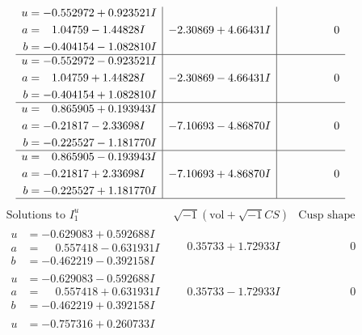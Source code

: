 \documentclass[1p]{elsarticle_modified}
\theoremstyle{definition}
\newcommand{\I}{\sqrt{-1}}
\begin{document}
$$\begin{array}{c|c|c}
\begin{aligned}
u &= -0.552972 + 0.923521 I \\
a &= \phantom{-}1.04759 - 1.44828 I \\
b &= -0.404154 - 1.082810 I\end{aligned}
 & -2.30869 + 4.66431 I & \phantom{-0.000000 } 0 \\ \hline\begin{aligned}
u &= -0.552972 - 0.923521 I \\
a &= \phantom{-}1.04759 + 1.44828 I \\
b &= -0.404154 + 1.082810 I\end{aligned}
 & -2.30869 - 4.66431 I & \phantom{-0.000000 } 0 \\ \hline\begin{aligned}
u &= \phantom{-}0.865905 + 0.193943 I \\
a &= -0.21817 - 2.33698 I \\
b &= -0.225527 - 1.181770 I\end{aligned}
 & -7.10693 - 4.86870 I & \phantom{-0.000000 } 0 \\ \hline\begin{aligned}
u &= \phantom{-}0.865905 - 0.193943 I \\
a &= -0.21817 + 2.33698 I \\
b &= -0.225527 + 1.181770 I\end{aligned}
 & -7.10693 + 4.86870 I & \phantom{-0.000000 } 0\\
 \hline 
 \end{array}$$\newpage$$\begin{array}{c|c|c}  
\text{Solutions to }I^u_{1}& \I (\text{vol} + \sqrt{-1}CS) & \text{Cusp shape}\\
 \hline 
\begin{aligned}
u &= -0.629083 + 0.592688 I \\
a &= \phantom{-}0.557418 - 0.631931 I \\
b &= -0.462219 - 0.392158 I\end{aligned}
 & \phantom{-}0.35733 + 1.72933 I & \phantom{-0.000000 } 0 \\ \hline\begin{aligned}
u &= -0.629083 - 0.592688 I \\
a &= \phantom{-}0.557418 + 0.631931 I \\
b &= -0.462219 + 0.392158 I\end{aligned}
 & \phantom{-}0.35733 - 1.72933 I & \phantom{-0.000000 } 0 \\ \hline\begin{aligned}
u &= -0.757316 + 0.260733 I \\

\end{aligned}
\end{array}$$
\end{document}
